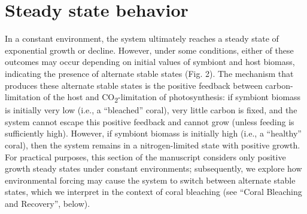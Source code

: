 \documentclass[]{elsarticle} %
\begin{document}
\section{Steady state behavior}\label{steady-state-behavior}

In a constant environment, the system ultimately reaches a steady state
of exponential growth or decline. However, under some conditions, either
of these outcomes may occur depending on initial values of symbiont and
host biomass, indicating the presence of alternate stable states (Fig.
2). The mechanism that produces these alternate stable states is the
positive feedback between carbon-limitation of the host and
CO\textsubscript{2}-limitation of photosynthesis: if symbiont biomass is
initially very low (i.e., a ``bleached'' coral), very little carbon is
fixed, and the system cannot escape this positive feedback and cannot
grow (unless feeding is sufficiently high). However, if symbiont biomass
is initially high (i.e., a ``healthy'' coral), then the system remains
in a nitrogen-limited state with positive growth. For practical
purposes, this section of the manuscript considers only positive growth
steady states under constant environments; subsequently, we explore how
environmental forcing may cause the system to switch between alternate
stable states, which we interpret in the context of coral bleaching (see
``Coral Bleaching and Recovery'', below).
\end{document}
